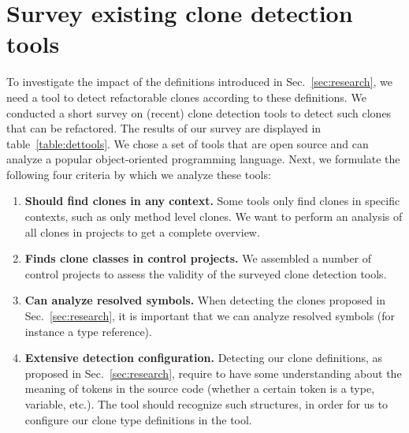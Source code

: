\documentclass[a4paper,UKenglish,cleveref, autoref, thm-restate,authorcolumns]{lipics-v2019}
\begin{document}
\section{Survey existing clone detection tools}\label{sec:survey}
To investigate the impact of the definitions introduced in Sec.~\ref{sec:research}, we need a tool to detect refactorable clones according to these definitions. We conducted a short survey on (recent) clone detection tools to detect such clones that can be refactored. The results of our survey are displayed in table~\ref{table:dettools}. We chose a set of tools that are open source and can analyze a popular object-oriented programming language. Next, we formulate the following four criteria by which we analyze these tools:
\begin{enumerate}
    \item \textbf{Should find clones in any context.} Some tools only find clones in specific contexts, such as only method level clones. We want to perform an analysis of all clones in projects to get a complete overview.
\item \textbf{Finds clone classes in control projects.} We assembled a number of control projects to assess the validity of the surveyed clone detection tools.
\item \textbf{Can analyze resolved symbols.} When detecting the clones proposed in Sec.~\ref{sec:research}, it is important that we can analyze resolved symbols (for instance a type reference).
\item \textbf{Extensive detection configuration.} Detecting our clone definitions, as proposed in Sec.~\ref{sec:research}, require to have some understanding about the meaning of tokens in the source code (whether a certain token is a type, variable, etc.). The tool should recognize such structures, in order for us to configure our clone type definitions in the tool.
\end{enumerate}
\end{document}
